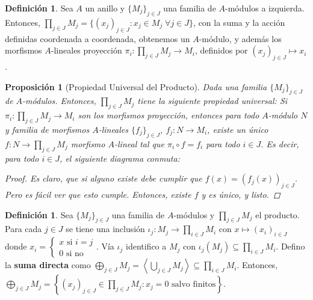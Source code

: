 \documentclass[12pt]{book}
\newtheorem{prop}[teo]{Proposición}
\theoremstyle{definition}
\newtheorem{defn}[teo]{Definición}
\begin{document}
\begin{defn}
Sea $A$ un anillo y $\{M_j\}_{j\in J}$ una familia de $A$-módulos a izquierda. Entonces, $\displaystyle\prod_{j\in J}M_j = \{(x_j)_{j\in J} : x_j\in M_j \; \forall j\in J\}$, con la suma y la acción definidas coordenada a coordenada, obtenemos un $A$-módulo, y además los morfismos $A$-lineales proyección $\pi_i:\displaystyle\prod_{j\in J}M_j\to M_i$, definidos por $(x_j)_{j\in J}\mapsto x_i$.
\end{defn}

\begin{prop}[Propiedad Universal del Producto]

Dada una familia $\{M_j\}_{j\in J}$ de $A$-módulos. Entonces, $\displaystyle\prod_{j\in J}M_j$ tiene la siguiente propiedad universal: Si $\pi_i:\displaystyle\prod_{j\in J}M_j\to M_i$ son los morfismos proyección, entonces para todo $A$-módulo $N$ y familia de morfismos $A$-lineales $\{f_j\}_{j\in J}$, $f_j:N\to M_i$, existe un único $f:N\to\displaystyle\prod_{j\in J}M_j$ morfismo $A$-lineal tal que $\pi_i\circ f = f_i$ para todo $i\in J$. Es decir, para todo $i\in J$, el siguiente diagrama conmuta: 
\begin{proof}
Es claro, que si alguno existe debe cumplir que $f(x) = (f_j(x))_{j\in J}$. Pero es fácil ver que esto cumple. Entonces, existe $f$ y es único, y listo.
\end{proof}
\end{prop}

\begin{defn}
Sea $\{M_j\}_{j\in J}$ una familia de $A$-módulos y $\displaystyle\prod_{j\in J}M_j$ el producto. Para cada $j\in J$ se tiene una inclusión $\iota_j:M_j\to\displaystyle\prod_{i\in J}M_i$ con $x\mapsto (x_i)_{i\in J}$ donde $x_i=\begin{cases}x\text{ si }i=j \\ 0 \text{ si no}\end{cases}$. Vía $\iota_j$ identifico a $M_j$ con $\iota_j(M_j)\subseteq \displaystyle\prod_{i\in J}M_i$. Defino la \textbf{suma directa} como $\displaystyle\bigoplus_{j\in J}M_j = \left\langle \displaystyle\bigcup_{j\in J} M_j \right\rangle \subseteq \displaystyle\prod_{i\in J}M_i$. Entonces, $\displaystyle\bigoplus_{j\in J}M_j = \left\{ (x_j)_{j\in J}\in\displaystyle\prod_{j\in J}M_j : x_j=0 \text{ salvo finitos}\right\}$.
\end{defn}
\end{document}

